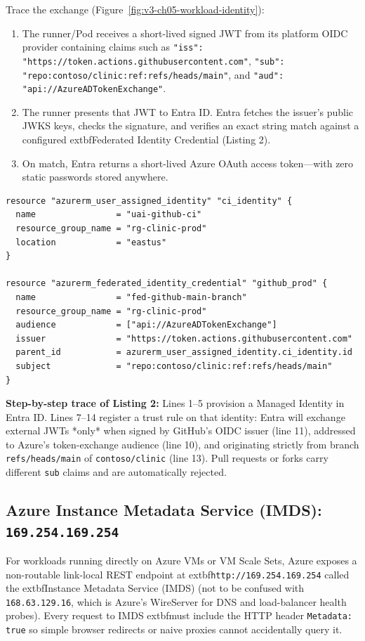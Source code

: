 Trace the exchange (Figure~\ref{fig:v3-ch05-workload-identity}):
\begin{enumerate}[leftmargin=15pt]
  \item The runner/Pod receives a short-lived signed JWT from its platform OIDC provider containing claims such as \texttt{"iss": "https://token.actions.githubusercontent.com"}, \texttt{"sub": "repo:contoso/clinic:ref:refs/heads/main"}, and \texttt{"aud": "api://AzureADTokenExchange"}.
  \item The runner presents that JWT to Entra ID. Entra fetches the issuer's public JWKS keys, checks the signature, and verifies an exact string match against a configured 	extbf{Federated Identity Credential} (Listing 2).
  \item On match, Entra returns a short-lived Azure OAuth access token—with zero static passwords stored anywhere.
\end{enumerate}

\begin{lstlisting}[language=hcl, caption={Terraform HCL Configuring an Azure Federated Identity Credential}]
resource "azurerm_user_assigned_identity" "ci_identity" {
  name                = "uai-github-ci"
  resource_group_name = "rg-clinic-prod"
  location            = "eastus"
}

resource "azurerm_federated_identity_credential" "github_prod" {
  name                = "fed-github-main-branch"
  resource_group_name = "rg-clinic-prod"
  audience            = ["api://AzureADTokenExchange"]
  issuer              = "https://token.actions.githubusercontent.com"
  parent_id           = azurerm_user_assigned_identity.ci_identity.id
  subject             = "repo:contoso/clinic:ref:refs/heads/main"
}
\end{lstlisting}

\textbf{Step-by-step trace of Listing 2:} Lines 1--5 provision a Managed Identity in Entra ID. Lines 7--14 register a trust rule on that identity: Entra will exchange external JWTs *only* when signed by GitHub's OIDC issuer (line 11), addressed to Azure's token-exchange audience (line 10), and originating strictly from branch \texttt{refs/heads/main} of \texttt{contoso/clinic} (line 13). Pull requests or forks carry different \texttt{sub} claims and are automatically rejected.

\subsection{Azure Instance Metadata Service (IMDS): \texttt{169.254.169.254}}
For workloads running directly on Azure VMs or VM Scale Sets, Azure exposes a non-routable link-local REST endpoint at 	extbf{\texttt{http://169.254.169.254}} called the 	extbf{Instance Metadata Service (IMDS)} (not to be confused with \texttt{168.63.129.16}, which is Azure's WireServer for DNS and load-balancer health probes). Every request to IMDS 	extbf{must include the HTTP header \texttt{Metadata: true}} so simple browser redirects or naive proxies cannot accidentally query it.

